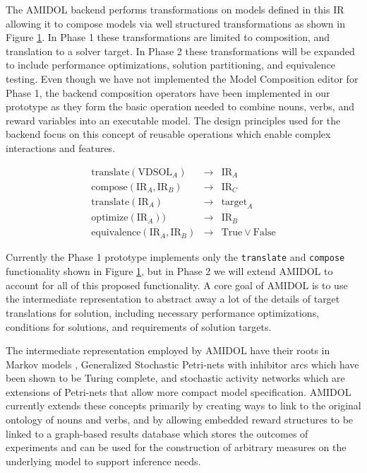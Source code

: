 \documentclass[11pt]{article}
\newcommand{\amidol}{\textsc{AMIDOL}}
\begin{document}
The \amidol{} backend performs transformations on models defined in this IR allowing it to compose models via well structured transformations as shown in Figure \ref{Fig:AMIDOLBackend}.  In Phase 1 these transformations are limited to composition, and translation to a solver target.  In Phase 2 these transformations will be expanded to include performance optimizations, solution partitioning, and equivalence testing.  Even though we have not implemented the Model Composition editor for Phase 1, the backend composition operators have been implemented in our prototype as they form the basic operation needed to combine nouns, verbs, and reward variables into an executable model.  The design principles used for the backend focus on this concept of reusable operations which enable complex interactions and features.

\begin{figure}
  \begin{eqnarray}
    \mathrm{translate}(\mathrm{VDSOL}_A) & \rightarrow & \mathrm{IR}_A\\
    \mathrm{compose}(\mathrm{IR}_A, \mathrm{IR}_B) & \rightarrow & \mathrm{IR}_C\\
    \mathrm{translate}(\mathrm{IR}_A) & \rightarrow & \mathrm{target}_A\\
    \mathrm{optimize}(\mathrm{IR}_A)) & \rightarrow & \mathrm{IR}_B\\
    \mathrm{equivalence}(\mathrm{IR}_A, \mathrm{IR}_B) & \rightarrow & \mathrm{True} \vee \mathrm{False}
  \end{eqnarray}
  \caption{}
  \label{Fig:AMIDOLBackend}
\end{figure}

Currently the Phase 1 prototype implements only the \texttt{translate} and \texttt{compose} functionality shown in Figure \ref{Fig:AMIDOLBackend}, but in Phase 2 we will extend \amidol{} to account for all of this proposed functionality.  A core goal of \amidol{} is to use the intermediate representation to abstract away a lot of the details of target translations for solution, including necessary performance optimizations, conditions for solutions, and requirements of solution targets.

The intermediate representation employed by \amidol{} have their roots in Markov models \cite{howard2012dynamic}, Generalized Stochastic Petri-nets with inhibitor arcs \cite{chiola1993generalized} which have been shown to be Turing complete, and stochastic activity networks \cite{movaghar1985performability,sanders2000stochastic} which are extensions of Petri-nets that allow more compact model specification.  \amidol{} currently extends these concepts primarily by creating ways to link to the original ontology of nouns and verbs, and by allowing embedded reward structures to be linked to a graph-based results database which stores the outcomes of experiments and can be used for the construction of arbitrary measures on the underlying model to support inference needs.
\end{document}
